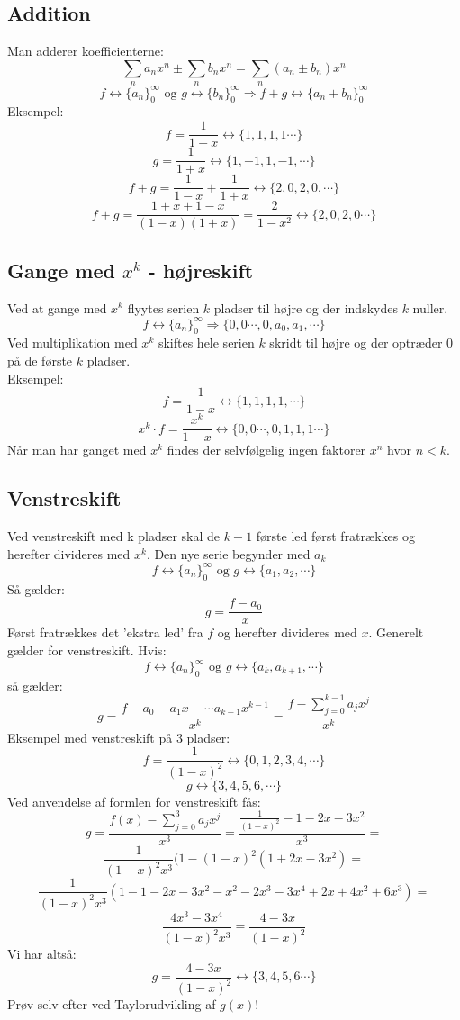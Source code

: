 \subsection*{Addition}
Man adderer koefficienterne:
\[\sum_{n}a_{n}x^{n} \pm \sum_{n}b_{n}x^{n}=\sum_{n}(a_{n} \pm b_{n})x^{n}\]
\[f \leftrightarrow \{a_{n}\}_{0}^{\infty} \text{  og  } g \leftrightarrow \{b_{n}\}_{0}^{\infty} \Rightarrow f+g \leftrightarrow \{a_{n}+b_{n}\}_{0}^{\infty}\]
Eksempel:
\[f=\frac{1}{1-x} \leftrightarrow \{1,1,1,1 \dotsm \}\]
\[g=\frac{1}{1+x} \leftrightarrow \{1,-1,1,-1, \dotsm \}\]
\[f+g=\frac{1}{1-x}+\frac{1}{1+x} \leftrightarrow \{2,0,2,0, \dotsm\}\]
\[f+g=\frac{1+x+1-x}{(1-x)(1+x)}=\frac{2}{1-x^{2}} \leftrightarrow \{2,0,2,0 \dotsm\}\]
\subsection*{Gange med \(x^{k}\) - højreskift}
Ved at gange med  \(x^{k}\) flyytes serien \(k\) pladser til højre og der indskydes \(k\) nuller.
\[f \leftrightarrow \{a_{n}\}_{0}^{\infty} \Rightarrow \{0,0 \dotsm ,0,a_{0},a_{1}, \dotsm\}\]
Ved multiplikation med \(x^{k}\) skiftes hele serien \(k\) skridt til højre og der optræder \(0\) på de første \(k\) pladser.\\
Eksempel:
\[f=\frac{1}{1-x} \leftrightarrow \{1,1,1,1, \dotsm\}\]
\[x^{k}\cdot f=\frac{x^{k}}{1-x} \leftrightarrow \{0,0 \dotsm,0,1,1,1\dotsm\}\]
Når man har ganget med \(x^{k}\) findes der selvfølgelig ingen faktorer \(x^{n}\) hvor \(n<k\).
\subsection*{Venstreskift}
Ved venstreskift med k pladser skal de \(k-1\) første led først fratrækkes og herefter divideres med \(x^k\). Den nye serie begynder med \(a_{k}\)
\[f \leftrightarrow \{a_{n}\}_{0}^{\infty} \text{ og } g \leftrightarrow \{a_{1},a_{2}, \dotsm\}\]
Så gælder:
\[g=\frac{f-a_{0}}{x}\]
Først fratrækkes det 'ekstra led' fra \(f\) og herefter divideres med \(x\).
Generelt gælder for venstreskift. Hvis:
\[f \leftrightarrow \{a_{n}\}_{0}^{\infty} \text{ og } g \leftrightarrow \{a_{k},a_{k+1}, \dotsm\}\]
så gælder:
\[g=\frac{f-a_{0}-a_{1}x-\dotsm a_{k-1}x^{k-1}}{x^{k}}=\frac{f-\sum_{j=0}^{k-1}a_{j}x^{j}}{x^{k}}\]
Eksempel med venstreskift på 3 pladser:
\[f=\frac{1}{(1-x)^{2}} \leftrightarrow \{0,1,2,3,4, \dotsm \}\]
\[g \leftrightarrow \{3,4,5,6, \dotsm\}\]
Ved anvendelse af formlen for venstreskift fås:
\[g=\frac{f(x)-\sum_{j=0}^{3}a_{j}x^{j}}{x^{3}}=\frac{\frac{1}{(1-x)^{2}}-1-2x-3x^{2}}{x^{3}}=\]
\[\frac{1}{(1-x)^{2}x^{3}}(1-(1-x)^{2}(1+2x-3x^{2})=\]
\[\frac{1}{(1-x)^{2}x^{3}}(1-1-2x-3x^{2}-x^{2}-2x^{3}-3x^{4}+2x+4x^{2}+6x^{3})=\]
\[\frac{4x^{3}-3x^{4}}{(1-x)^{2}x^{3}}=\frac{4-3x}{(1-x)^{2}}\]
Vi har altså:
\[g=\frac{4-3x}{(1-x)^{2}} \leftrightarrow \{3,4,5,6 \dotsm \}\] 
Prøv selv efter ved Taylorudvikling af \(g(x)\)!
